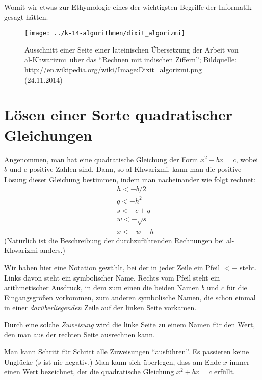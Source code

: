 Womit wir etwas zur Ethymologie eines der wichtigsten Begriffe der
Informatik gesagt hätten.

\begin{figure}[h]
  \centering
  \texttt{[image: ../k-14-algorithmen/dixit\_algorizmi]}
  \caption{Ausschnitt einer Seite einer lateinischen Übersetzung der
    Arbeit von al-Khw\=arizm\=\i\ über das "`Rechnen mit indischen
    Ziffern"'; Bildquelle:
    \url{http://en.wikipedia.org/wiki/Image:Dixit_algorizmi.png}
    (24.11.2014)}
  \label{abb:dixit_algorizmi}
\end{figure}
  
\Tut\section{L\"osen einer Sorte quadratischer Gleichungen}

Angenommen, man hat eine quadratische Gleichung der Form $x^2+bx=c$,
wobei $b$ und $c$ positive Zahlen sind. Dann, so al-Khwarizmi,
kann man die positive Lösung dieser Gleichung bestimmen, indem man
nacheinander wie folgt rechnet:
%
  \begin{align}
    &h <- b/2 \label{foo1} \\
    &q <- h^2 \\
    &s <- c+q \\
    &w <- \sqrt{s} \\
    &x <- w-h \label{foo5} 
  \end{align}
%
(Natürlich ist die Beschreibung der durchzuführenden Rechnungen bei
al-Khwarizmi anders.)

Wir haben hier eine Notation gewählt, bei der in jeder Zeile ein Pfeil
$<-$ steht. Links davon steht ein symbolischer Name.
Rechts vom Pfeil steht ein arithmetischer Ausdruck, in dem zum einen
die beiden Namen $b$ und $c$ für die Eingangsgrößen vorkommen, zum
anderen symbolische Namen, die schon einmal in einer
\emph{darüberliegenden} Zeile auf der linken Seite vorkamen.

Durch eine solche \emph{Zuweisung} wird die linke Seite zu einem Namen
für den Wert, den man aus der rechten Seite ausrechnen kann.

Man kann Schritt für Schritt alle Zuweisungen "`ausführen"'. Es
passieren keine Unglücke ($s$ ist nie negativ.) Man kann sich
überlegen, dass am Ende $x$ immer einen Wert bezeichnet, der die
quadratische Gleichung $x^2+bx=c$ erfüllt.

